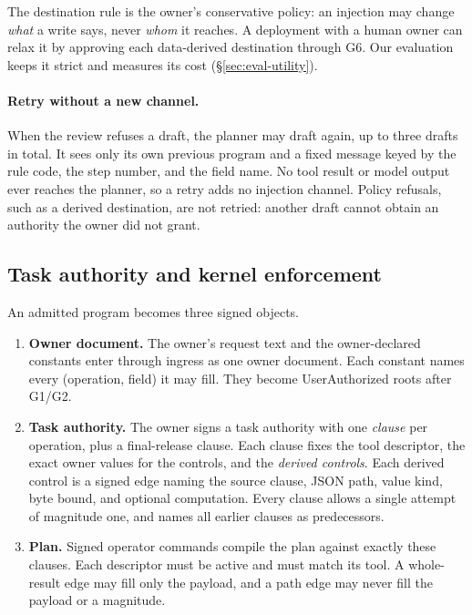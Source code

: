 \documentclass[letterpaper,twocolumn,10pt]{article}
\begin{document}
The destination rule is the owner's conservative policy: an injection may
change \emph{what} a write says, never \emph{whom} it reaches. A deployment
with a human owner can relax it by approving each data-derived destination
through G6. Our evaluation keeps it strict and measures its cost
(\S\ref{sec:eval-utility}).

\paragraph{Retry without a new channel.} When the review refuses a draft,
the planner may draft again, up to three drafts in total. It sees only its
own previous program and a fixed message keyed by the rule code, the step
number, and the field name. No tool result or model output ever reaches
the planner, so a retry adds no injection channel. Policy refusals, such
as a derived destination, are not retried: another draft cannot obtain an
authority the owner did not grant.

\subsection{Task authority and kernel enforcement}
\label{sec:authority-programs}

An admitted program becomes three signed objects.
\begin{enumerate}
\item \textbf{Owner document.} The owner's request text and the
  owner-declared constants enter through ingress as one owner document.
  Each constant names every (operation, field) it may fill. They become
  \textsf{UserAuthorized} roots after G1/G2.
\item \textbf{Task authority.} The owner signs a task authority with one
  \emph{clause} per operation, plus a final-release clause. Each clause
  fixes the tool descriptor, the exact owner values for the controls, and
  the \emph{derived controls}. Each derived control is a signed edge
  naming the source clause, JSON path, value kind, byte bound, and
  optional computation. Every clause allows a single attempt of magnitude
  one, and names all earlier clauses as predecessors.
\item \textbf{Plan.} Signed operator commands compile the plan against
  exactly these clauses. Each descriptor must be active and must match its
  tool. A whole-result edge may fill only the payload, and a path edge may
  never fill the payload or a magnitude.
\end{enumerate}
\end{document}
